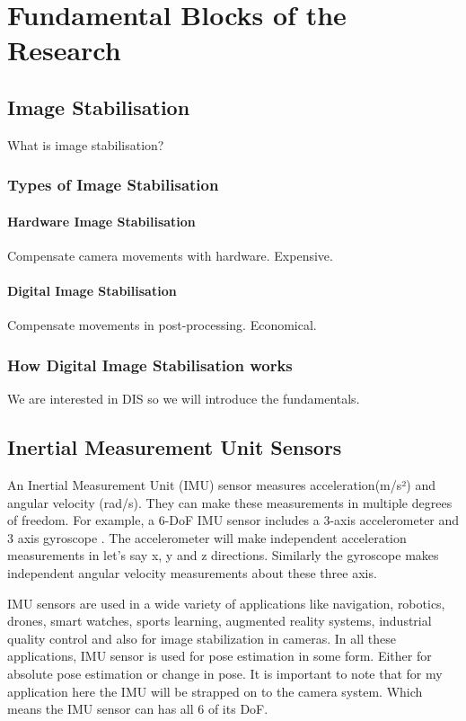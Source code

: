 \chapter{Fundamental Blocks of the Research} \label{chapter_two}


\section{Image Stabilisation}
What is image stabilisation?

\subsection{Types of Image Stabilisation}
\subsubsection{Hardware Image Stabilisation}
Compensate camera movements with hardware. Expensive.

\subsubsection{Digital Image Stabilisation}
Compensate movements in post-processing. Economical.

\subsection{How Digital Image Stabilisation works}
We are interested in DIS so we will introduce the fundamentals.

\section{Inertial Measurement Unit Sensors}
An Inertial Measurement Unit (IMU) sensor measures acceleration(m/s²) and angular velocity (rad/s).  They can make these measurements in multiple degrees of freedom. For example, a 6-DoF IMU sensor includes a 3-axis accelerometer and 3 axis gyroscope  \citet{constant2021data}. The accelerometer will make independent acceleration measurements in let's say x, y and z directions. Similarly the gyroscope makes independent angular velocity measurements about these three axis.

IMU sensors are used in a wide variety of applications like navigation, robotics, drones, smart watches, sports learning, augmented reality systems, industrial quality control\citet{ahmad2013reviews}  and also for image stabilization in cameras. In all these applications, IMU sensor is used for pose estimation in some form. Either for absolute pose estimation or change in pose. It is important to note that for my application here the IMU will be strapped on to the camera system. Which means the IMU sensor can has all 6 of its DoF.


